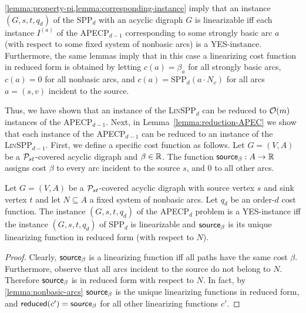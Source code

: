 \cref{lemma:property-pi,lemma:corresponding-instance} imply that an instance $(G,s,t,q_d)$ of the SPP$_d$ with an acyclic digraph $G$ is linearizable  iff each  instance $I^{(a)}$ of the APECP$_{d-1}$ corresponding to some strongly basic arc $a$   (with respect to some fixed system of nonbasic arcs)  is a YES-instance. Furthermore, the same lemmas imply that in this case a linearizing cost function in reduced form is obtained by letting $c(a) = \beta_a$ for all strongly basic arcs, $c(a) = 0$ for all nonbasic arcs, and $c(a) = \text{SPP}_d(a \cdot N_v)$ for all arcs $a = (s,v)$ incident to the source.


Thus, we have shown that an instance of the  \textsc{Lin}SPP$_d$ can be reduced to $\mathcal{O}(m)$ instances  of the APECP$_{d-1}$.  
Next, in Lemma~\ref{lemma:reduction-APEC} we show that each instance of the APECP$_{d-1}$  can  be reduced to an instance of  the \textsc{Lin}SPP$_{d-1}$.
%
First, we define a specific cost function as follows. 
Let $G = (V, A)$ be a $\mathcal{P}_{st}$-covered acyclic digraph and $\beta \in \mathbb{R}$. The function $\textsf{source}_\beta : A \rightarrow \mathbb{R}$  assigns cost $\beta$ to every arc incident to the source $s$, and $0$ to all other arcs. 

\begin{lemma}
\label{lemma:reduction-APEC}
    Let $G = (V, A)$ be a $\mathcal{P}_{st}$-covered acyclic digraph with source vertex $s$ and sink vertex $t$ and let  $N \subseteq A$ a fixed system of nonbasic arcs. Let $q_d$ be an order-$d$  cost function. The instance $(G,s,t,q_d)$ of the APECP$_d$ problem is a YES-instance iff the instance $(G,s,t, q_d)$ of SPP$_d$ is linearizable and $\textsf{source}_\beta$ is its unique linearizing function in reduced form (with respect to $N$).
\end{lemma}
\begin{proof}
    Clearly,  $\textsf{source}_\beta$ is a linearizing function iff   all paths have the same cost $\beta$. %
    Furthermore, observe that all  arcs incident to the source do not belong to $N$. Therefore $\textsf{source}_\beta$ is in reduced form with respect to $N$. In fact, by \cref{lemma:nonbasic-arcs}  $\textsf{source}_\beta$ is the unique linearizing  functions in reduced form, and $\operatorname{\textsf{reduced}}(c') = \textsf{source}_\beta$ for all other linearizing functions $c'$.
\end{proof}


